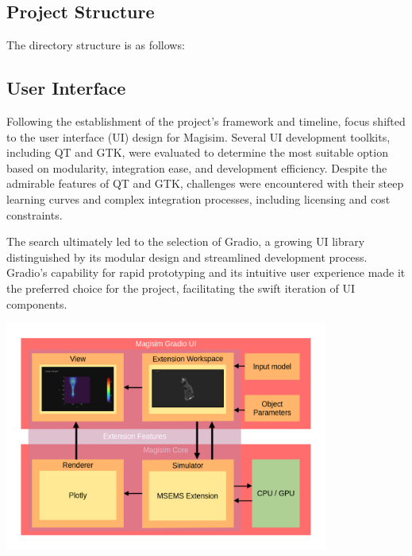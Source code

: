 \documentclass[11pt, a4paper, titlepage]{article}
\begin{document}
\subsection{Project Structure}
The directory structure is as follows:

\newpage


\subsection{User Interface}

Following the establishment of the project's framework and timeline, focus shifted to the user interface (UI) design for Magisim. Several UI development toolkits, including QT and GTK, were evaluated to determine the most suitable option based on modularity, integration ease, and development efficiency. Despite the admirable features of QT and GTK, challenges were encountered with their steep learning curves and complex integration processes, including licensing and cost constraints.

The search ultimately led to the selection of Gradio, a growing UI library distinguished by its modular design and streamlined development process. Gradio's capability for rapid prototyping and its intuitive user experience made it the preferred choice for the project, facilitating the swift iteration of UI components.
\begin{center}
	\includegraphics[width=0.8\textwidth]{softstruct.png}
\end{center}
\end{document}
